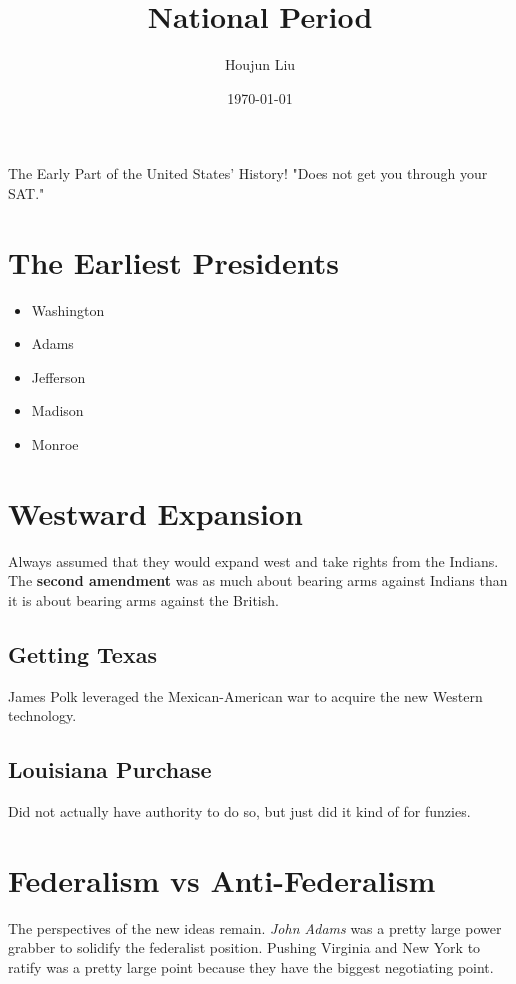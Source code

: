 \documentclass[11pt]{article}
\author{Houjun Liu}
\date{\today}
\title{National Period}
\begin{document}
\maketitle
\tableofcontents

The Early Part of the United States' History! "Does not get you through your SAT."

\section{The Earliest Presidents}
\label{sec:org87e0ae3}
\begin{itemize}
\item Washington
\item Adams
\item Jefferson
\item Madison
\item Monroe
\end{itemize}

\section{Westward Expansion}
\label{sec:org6cc5558}
Always assumed that they would expand west and take rights from the Indians. The \textbf{\textbf{second amendment}} was as much about bearing arms against Indians than it is about bearing arms against the British.

\subsection{Getting Texas}
\label{sec:org4825985}
James Polk leveraged the Mexican-American war to acquire the new Western technology.

\subsection{Louisiana Purchase}
\label{sec:orga15a395}
Did not actually have authority to do so, but just did it kind of for funzies.

\section{Federalism vs Anti-Federalism}
\label{sec:orgbd0040e}
The perspectives of the new ideas remain. \emph{John Adams} was a pretty large power grabber to solidify the federalist position. Pushing Virginia and New York to ratify was a pretty large point because they have the biggest negotiating point.
\end{document}
